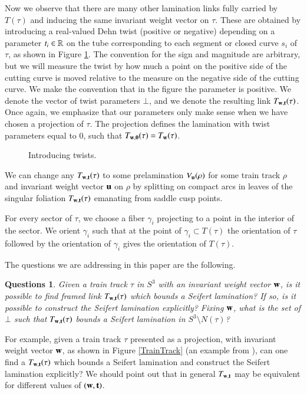 \documentclass[12pt]{article}
\newtheorem{questions}[thm]{Questions}
\theoremstyle{remark}
\begin{document}
Now we observe that there are many other lamination links fully carried by $T(\tau)$ and inducing the same invariant weight vector on $\tau$.   These are obtained by introducing a real-valued Dehn twist (positive or negative) depending on a parameter $t_i\in \mathbb R$ on the tube corresponding to each segment or closed curve $s_i$ of $\tau$, as shown in Figure \ref{Twist}.  The convention for the sign and magnitude are arbitrary, but we will measure the twist by how much a point  on the positive side of the cutting curve is moved relative to the measure on the negative side of the cutting curve.   We make the convention that in the figure the parameter is positive.   We denote the vector of twist parameters $\bot$, and we denote the resulting link $T_{{\bf w},{\bf t}}(\tau)$.   Once again, we emphasize that our parameters only make sense when we have chosen a projection of $\tau$.  The projection defines the lamination with twist parameters equal to 0, such that $T_{{\bf w},{\bf 0}}(\tau)=T_{\bf w}(\tau)$.

\begin{figure}[H]
\centering
{}
\caption{\footnotesize Introducing twists. }
\label{Twist}
\end{figure}

We can change any $T_{{\bf w},{\bf t}}(\tau)$ to some prelamination $V_{\bf u}(\rho)$ for some train track $\rho$ and invariant weight vector ${\bf u}$ on $\rho$ by splitting on compact arcs in leaves of the singular foliation $T_{{\bf w},{\bf t}}(\tau)$ emanating from saddle cusp points.

  For every sector of $\tau$, we choose a fiber $\gamma_i$ projecting to a point in the interior of the sector.   We orient $\gamma_i$ such that at the point of $\gamma_i\subset T(\tau)$ the orientation of $\tau$ followed by the orientation of $\gamma_i$ gives the orientation of $T(\tau)$.


The questions we are addressing in this paper are the following.   

\begin{questions}
Given a train track $\tau$ in $S^3$ with an invariant weight vector ${\bf w}$, is it possible to find  framed link $T_{{\bf w},{\bf t}}(\tau)$ which bounds a Seifert lamination?   If so, is it possible to construct the Seifert lamination explicitly?   Fixing ${\bf w}$, what is the set of $\bot$ such that  $T_{{\bf w},{\bf t}}(\tau)$ bounds a Seifert lamination in $S^3\setminus N(\tau)$?
\end{questions}

For example, given a train track $\tau$ presented as a projection, with invariant weight vector ${\bf w}$, as shown in Figure \ref{TrainTrack}  (an example from \cite{UO:LamLinks}), can one find a $T_{{\bf w},{\bf t}}(\tau)$ which bounds a Seifert lamination and construct the Seifert lamination explicitly?  We should point out that in general $T_{{\bf w},{\bf t}}$ may be equivalent for different values of $({\bf w},{\bf t})$.
\end{document}

